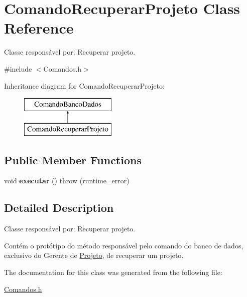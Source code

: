 \hypertarget{class_comando_recuperar_projeto}{}\section{Comando\+Recuperar\+Projeto Class Reference}
\label{class_comando_recuperar_projeto}


Classe responsável por\+: Recuperar projeto.  




{\ttfamily \#include $<$Comandos.\+h$>$}

Inheritance diagram for Comando\+Recuperar\+Projeto\+:\begin{figure}[H]
\begin{center}
\leavevmode
\includegraphics[height=2.000000cm]{class_comando_recuperar_projeto}
\end{center}
\end{figure}
\subsection*{Public Member Functions}
\begin{DoxyCompactItemize}
\item 
\hypertarget{class_comando_recuperar_projeto_af5deb7420caaacbaa84c8b9eed5239fa}{}\label{class_comando_recuperar_projeto_af5deb7420caaacbaa84c8b9eed5239fa} 
void {\bfseries executar} ()  throw (runtime\+\_\+error)
\end{DoxyCompactItemize}


\subsection{Detailed Description}
Classe responsável por\+: Recuperar projeto. 

Contém o protótipo do método responsável pelo comando do banco de dados, exclusivo do Gerente de \hyperlink{class_projeto}{Projeto}, de recuperar um projeto. 

The documentation for this class was generated from the following file\+:\begin{DoxyCompactItemize}
\item 
\hyperlink{_comandos_8h}{Comandos.\+h}\end{DoxyCompactItemize}
